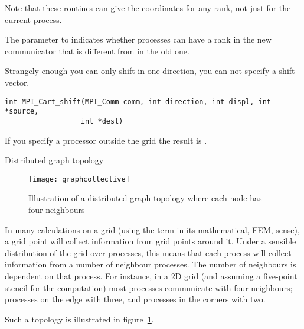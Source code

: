 Note that these routines can give the coordinates for any rank,
not just for the current process.
%

The  parameter to 
indicates whether processes can have a rank
in the new communicator that is different from in the old one.

Strangely enough you can only shift in one direction, you can not
specify a shift vector.
\begin{lstlisting}
int MPI_Cart_shift(MPI_Comm comm, int direction, int displ, int *source, 
                  int *dest)
\end{lstlisting}
If you specify a processor outside the grid
the result is .


 {Distributed graph topology}
\label{sec:mpi-dist-graph}

\begin{figure}
  \texttt{[image: graphcollective]}
  \caption{Illustration of a distributed graph topology where each
    node has four neighbours}
  \label{fig:graphcollective}
\end{figure}

In many calculations on a grid (using the term in its mathematical,
\ac{FEM}, sense), a grid point will collect information from grid
points around it. Under a sensible distribution of the grid over
processes, this means that each process will collect information from
a number of neighbour processes. The number of 
neighbours is dependent on that process. For instance, in a 2D
grid (and assuming a five-point stencil for the computation) most
processes communicate with four neighbours; processes on the edge with
three, and processes in the corners with two.

Such a topology is illustrated in figure~\ref{fig:graphcollective}.

